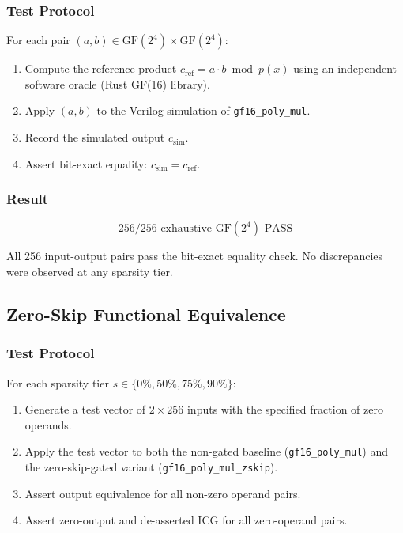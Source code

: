 \subsubsection{Test Protocol}

For each pair \((a, b) \in \mathrm{GF}(2^4) \times \mathrm{GF}(2^4)\):
\begin{enumerate}
  \item Compute the reference product \(c_{\mathrm{ref}} = a \cdot b \bmod p(x)\)
        using an independent software oracle (Rust GF(16) library).
  \item Apply \((a, b)\) to the Verilog simulation of \texttt{gf16\_poly\_mul}.
  \item Record the simulated output \(c_{\mathrm{sim}}\).
  \item Assert bit-exact equality: \(c_{\mathrm{sim}} = c_{\mathrm{ref}}\).
\end{enumerate}

\subsubsection{Result}

\[
\boxed{256/256 \text{ exhaustive GF}(2^4) \text{ PASS}}
\]

All 256 input-output pairs pass the bit-exact equality check.
No discrepancies were observed at any sparsity tier.

\subsection{Zero-Skip Functional Equivalence}

\subsubsection{Test Protocol}

For each sparsity tier \(s \in \{0\%, 50\%, 75\%, 90\%\}\):
\begin{enumerate}
  \item Generate a test vector of \(2 \times 256\) inputs with the
        specified fraction of zero operands.
  \item Apply the test vector to both the non-gated baseline
        (\texttt{gf16\_poly\_mul}) and the zero-skip-gated variant
        (\texttt{gf16\_poly\_mul\_zskip}).
  \item Assert output equivalence for all non-zero operand pairs.
  \item Assert zero-output and de-asserted ICG for all zero-operand pairs.
\end{enumerate}

